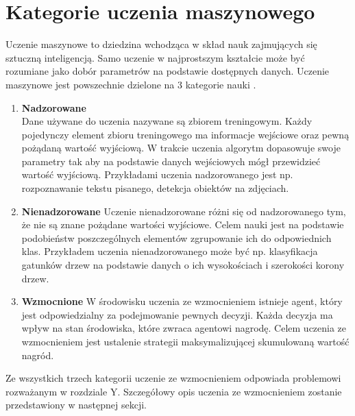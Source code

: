 \documentclass[12pt]{book}
\theoremstyle{plain}
\begin{document}
\section{Kategorie uczenia maszynowego}
Uczenie maszynowe to dziedzina wchodząca w skład nauk zajmujących się sztuczną inteligencją. Samo uczenie w najprostszym kształcie może być rozumiane jako dobór parametrów na podstawie dostępnych danych. Uczenie maszynowe jest powszechnie dzielone na 3 kategorie nauki \cite{machineLearningClassification}.
\begin{enumerate}
	\item \textbf{Nadzorowane} \\
	Dane używane do uczenia nazywane są zbiorem treningowym. Każdy pojedynczy element zbioru treningowego ma informacje wejściowe oraz pewną pożądaną wartość wyjściową. W trakcie uczenia algorytm dopasowuje swoje parametry tak aby na podstawie danych wejściowych mógł przewidzieć wartość wyjściową. Przykładami uczenia nadzorowanego jest np. rozpoznawanie tekstu pisanego, detekcja obiektów na zdjęciach.
	\item \textbf{Nienadzorowane}
	Uczenie nienadzorowane różni się od nadzorowanego tym, że nie  są znane pożądane wartości wyjściowe. Celem nauki jest na podstawie podobieństw poszczególnych elementów zgrupowanie ich do odpowiednich klas. Przykładem uczenia nienadzorowanego może być np. klasyfikacja gatunków drzew na podstawie danych o ich wysokościach i szerokości korony drzew.
	\item \textbf{Wzmocnione}
	W środowisku uczenia ze wzmocnieniem istnieje agent, który jest odpowiedzialny za podejmowanie pewnych decyzji. Każda decyzja ma wpływ na stan środowiska, które zwraca agentowi nagrodę. Celem uczenia ze wzmocnieniem jest ustalenie strategii maksymalizującej skumulowaną wartość nagród.
\end{enumerate}
Ze wszystkich trzech kategorii uczenie ze wzmocnieniem odpowiada problemowi rozważanym w rozdziale Y. Szczegółowy opis uczenia ze wzmocnieniem zostanie przedstawiony w następnej sekcji.
\end{document}
